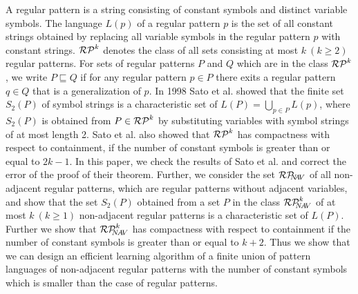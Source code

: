 \begin{summary}
A regular pattern is a string consisting of constant symbols and distinct variable symbols.
The language $L(p)$ of a regular pattern $p$ is the set of all constant strings obtained by replacing all variable symbols in the regular pattern $p$ with constant strings.
$\mathcal{RP}^{k}$ denotes the class of all sets consisting at most $k~(k\geq 2)$ regular patterns.
For sets of regular patterns $P$ and $Q$ which are in the class $\mathcal{RP}^{k}$, we write  $P \sqsubseteq Q$ if for any regular pattern $p \in P$ there exits a regular pattern  $q \in Q$ that is a generalization of $p$.
In 1998 Sato et al.\cite{Sato1} showed that the finite set $S_2(P)$ of symbol strings is a characteristic set of $L(P)=\bigcup_{p\in P}L(p)$, where $S_2(P)$ is obtained from $P\in \mathcal{RP}^{k}$ by substituting variables with symbol strings of at most length 2. 
Sato et al.\cite{Sato1} also showed that $\mathcal{RP}^{k}$  has compactness with respect to containment, if the number of constant symbols is greater than or equal to $2k-1$.
In this paper, we check the results of Sato et al.\cite{Sato1} and correct the error of the proof of their theorem.
Further, we consider the set $\mathcal{RP}_{\!\!\!N\!\!A\!V}$ of all non-adjacent regular patterns, which are regular patterns without adjacent variables, and show that the set $S_2(P)$ obtained from a set $P$ in the class $\mathcal{RP}^{k}_{\!\!\!N\!A\!V}$ of at most $k~(k\ge 1)$ non-adjacent regular patterns is a characteristic set of $L(P)$.
Further we show that $\mathcal{RP}^{k}_{\!\!\!N\!A\!V}$  has compactness with respect to containment if the number of constant symbols is greater than or equal to $k+2$.
Thus we show that we can design an efficient learning algorithm of a finite union of pattern languages of non-adjacent regular patterns with the number of constant symbols which is smaller than the case of regular patterns.
\end{summary}
